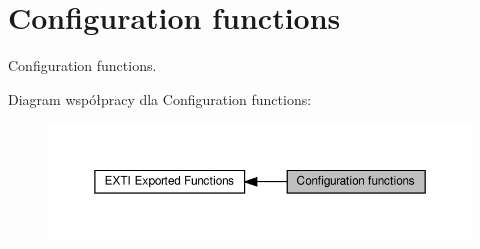 \hypertarget{group___e_x_t_i___exported___functions___group1}{}\section{Configuration functions}
\label{group___e_x_t_i___exported___functions___group1}


Configuration functions.  


Diagram współpracy dla Configuration functions\+:\nopagebreak
\begin{figure}[H]
\begin{center}
\leavevmode
\includegraphics[width=350pt]{group___e_x_t_i___exported___functions___group1}
\end{center}
\end{figure}
